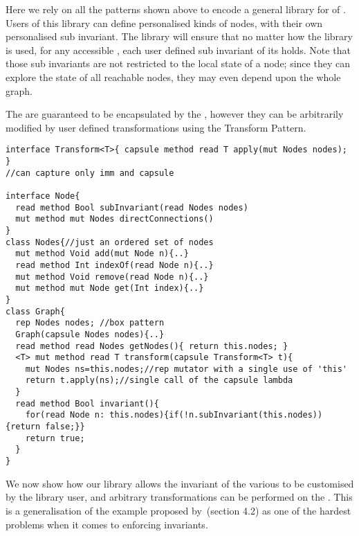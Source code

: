 


Here we rely on all the patterns shown above to encode a general library for \Q@Graph@s
of \Q@Node@s.
Users of this library can define personalised kinds of nodes,
with their own personalised sub invariant.
The library will ensure that no matter how the library is used, for any accessible \Q@Graph@, each user defined sub invariant of its \Q@Node@s holds.
Note that those sub invariants are not restricted to the local state of a node; since they can explore the state of all reachable nodes, they may even depend upon the whole graph.

The \Q@Node@s are guaranteed to be encapsulated by the \Q@Graph@, however they can be arbitrarily modified by user defined transformations using the Transform Pattern.
\begin{lstlisting}
interface Transform<T>{ capsule method read T apply(mut Nodes nodes); }
//can capture only imm and capsule

interface Node{
  read method Bool subInvariant(read Nodes nodes)
  mut method mut Nodes directConnections()
}
class Nodes{//just an ordered set of nodes 
  mut method Void add(mut Node n){..}
  read method Int indexOf(read Node n){..}
  mut method Void remove(read Node n){..}
  mut method mut Node get(Int index){..}
}
class Graph{ 
  rep Nodes nodes; //box pattern
  Graph(capsule Nodes nodes){..}
  read method read Nodes getNodes(){ return this.nodes; }
  <T> mut method read T transform(capsule Transform<T> t){
    mut Nodes ns=this.nodes;//rep mutator with a single use of 'this'
    return t.apply(ns);//single call of the capsule lambda
  }
  read method Bool invariant(){
    for(read Node n: this.nodes){if(!n.subInvariant(this.nodes)){return false;}}
    return true;
  }
}
\end{lstlisting}
We now show how our \Q@Graph@ library allows the invariant of the various \Q@Node@s to be customised by the library user, and arbitrary transformations can be performed on the \Q@Graph@s. This is a generalisation of the example proposed by~\cite{Summers:2009:NFO:1562154.1562160}(section 4.2) as one of the hardest problems when it comes to enforcing invariants.

